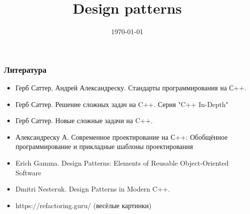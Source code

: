 \documentclass{beamer}
\title{Design patterns}
\date{\today}
\begin{document}
	\titlepage








\begin{frame}
  \frametitle{Литература}
  \begin{itemize}
    \item Герб Саттер, Андрей Александреску. Стандарты программирования на С++. 
    \item Герб Саттер. Решение сложных задач на C++. Серия "C++ In-Depth"
    \item Герб Саттер. Новые сложные задачи на C++. 
    
    \vspace{10pt}
    \item Александреску А. Современное проектирование на С++: Обобщённое программирование и прикладные шаблоны проектирования
    
    \vspace{10pt}
    \item	Erich Gamma. Design Patterns: Elements of Reusable Object-Oriented Software
    \item Dmitri Nesteruk. Design Patterns in Modern C++.
    
    \vspace{10pt}
    \item https://refactoring.guru/ (весёлые картинки)
  \end{itemize}
\end{frame}
\end{document}
